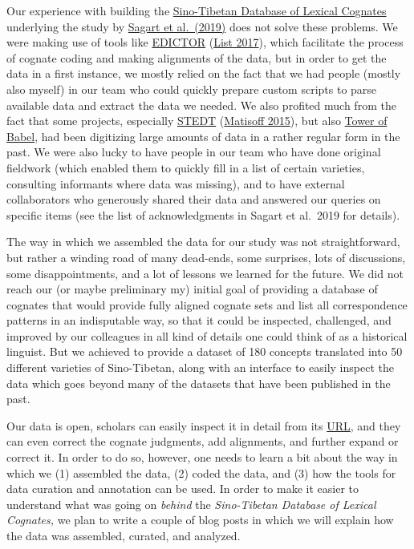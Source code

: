\documentclass[
  a4paper,
  14pt,
  oneside,
  tablecaptionabove
]{scrbook}
\begin{document}
Our experience with building the
\href{https://dighl.github.io/sinotibetan}{Sino-Tibetan Database of
Lexical Cognates} underlying the study by
\href{http://bibliography.lingpy.org?key=Sagart2019}{Sagart et
al.~(2019)} does not solve these problems. We were making use of tools
like \href{http://tsv.lingpy.org}{EDICTOR} (\href{http://bibliography.lingpy.org?key=List2017d}{List 2017}), which
facilitate the process of cognate coding and making alignments of the
data, but in order to get the data in a first instance, we mostly relied
on the fact that we had people (mostly also myself) in our team who
could quickly prepare custom scripts to parse available data and extract
the data we needed. We also profited much from the fact that some
projects, especially \href{http://stedt.berkeley.edu/}{STEDT} (\href{http://bibliography.lingpy.org?key=Matisoff2015}{Matisoff 2015}),
but also \href{http://starling.rinet.ru/}{Tower of Babel}, had been
digitizing large amounts of data in a rather regular form in the past.
We were also lucky to have people in our team who have done original
fieldwork (which enabled them to quickly fill in a list of certain
varieties, consulting informants where data was missing), and to have
external collaborators who generously shared their data and answered our
queries on specific items (see the list of acknowledgments in Sagart et
al.~2019 for details).

The way in which we assembled the data for our study was not
straightforward, but rather a winding road of many dead-ends, some
surprises, lots of discussions, some disappointments, and a lot of
lessons we learned for the future. We did not reach our (or maybe
preliminary my) initial goal of providing a database of cognates that
would provide fully aligned cognate sets and list all correspondence
patterns in an indisputable way, so that it could be inspected,
challenged, and improved by our colleagues in all kind of details one
could think of as a historical linguist. But we achieved to provide a
dataset of 180 concepts translated into 50 different varieties of
Sino-Tibetan, along with an interface to easily inspect the data which
goes beyond many of the datasets that have been published in the past.

Our data is open, scholars can easily inspect it in detail from its
\href{https://dighl.github.org/sinotibetan}{URL}, and they can even
correct the cognate judgments, add alignments, and further expand or
correct it. In order to do so, however, one needs to learn a bit about
the way in which we (1) assembled the data, (2) coded the data, and (3)
how the tools for data curation and annotation can be used. In order to
make it easier to understand what was going on \emph{behind} the
\emph{Sino-Tibetan Database of Lexical Cognates,} we plan to write a
couple of blog posts in which we will explain how the data was
assembled, curated, and analyzed.
\end{document}
